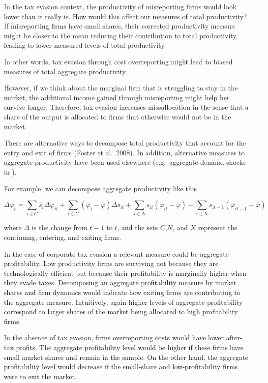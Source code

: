 \documentclass[
  12pt]{article}
\theoremstyle{definition}
\theoremstyle{remark}
\begin{document}
In the tax evasion context, the productivity of misreporting firms would
look lower than it really is. How would this affect our measures of
total productivity? If misreporting firms have small shares, their
corrected productivity measure might be closer to the mean reducing
their contribution to total productivity, leading to lower measured
levels of total productivity.

In other words, tax evasion through cost overreporting might lead to
biased measures of total aggregate productivity.

However, if we think about the marginal firm that is struggling to stay
in the market, the additional income gained through misreporting might
help her survive longer. Therefore, tax evasion increases missallocation
in the sense that a share of the output is allocated to firms that
otherwise would not be in the market.

There are alternative ways to decompose total productivity that account
for the entry and exit of firms (Foster et al.~2008). In addition,
alternative measures to aggregate productivity have been used elsewhere
(e.g.~aggregate demand shocks in \citet{Eslava2004}).

For example, we can decompose aggregate productivity like this

\[
\Delta\varphi_t = \sum_{i \in C}\bar s_i \Delta\varphi_{it} + \sum_{i\in C}(\bar\varphi_i-\bar\varphi)\Delta s_{it}+\sum_{i\in N} s_{it}\left(\varphi_{it}-\bar\varphi\right)-\sum_{i\in X}s_{it-1}\left(\varphi_{it-1}-\bar \varphi\right)
\]

where \(\Delta\) is the change from \(t-1\) to \(t\), and the sets
\(C\),\(N\), and \(X\) represent the continuing, entering, and exiting
firms.

In the case of corporate tax evasion a relevant measure could be
aggregate profitability. Low productivity firms are surviving not
because they are technologically efficient but because their
profitability is marginally higher when they evade taxes. Decomposing an
aggregate profitability measure by market shares and firm dynamics would
indicate how exiting firms are contributing to the aggregate measure.
Intuitively, again higher levels of aggregate profitability correspond
to larger shares of the market being allocated to high profitability
firms.

In the absence of tax evasion, firms overreporting costs would have
lower after-tax profits. The aggregate profitability level would be
higher if these firms have small market shares and remain in the sample.
On the other hand, the aggregate profitability level would decrease if
the small-share and low-profitability firms were to exit the market.
\end{document}

